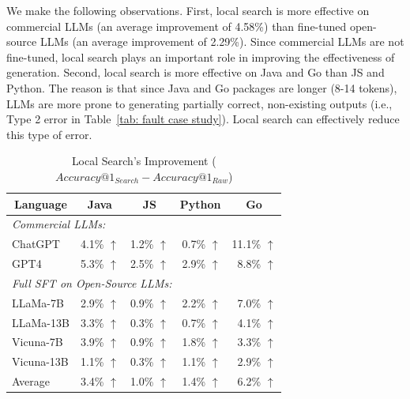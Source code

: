 We make the following observations. First, local search is more effective on commercial LLMs (an average improvement of 4.58\%) than fine-tuned open-source LLMs (an average improvement of 2.29\%).
Since commercial LLMs are not fine-tuned, local search plays an important role in improving the effectiveness of generation. Second, local search is more effective on Java and Go than JS and Python. The reason is that since Java and Go packages are longer (8-14 tokens), LLMs are more prone to generating partially correct, non-existing outputs (i.e., Type 2 error in Table~\ref{tab: fault case study}).  Local search can effectively reduce this type of error. 

\begin{table}[t]
\centering
\small
\caption{Local Search's Improvement ($Accuracy@1_{Search} - Accuracy@1_{Raw}$)}
\label{tab: post processing}
\begin{tabular}{lrrrr}
\toprule
\multicolumn{1}{c}{\multirow{1}{*}{Language}} & \multicolumn{1}{c}{Java}                        &        \multicolumn{1}{c}{JS}                 &          \multicolumn{1}{c}{Python}               &     \multicolumn{1}{c}{Go}                    \\
\midrule
\multicolumn{3}{l}{\textit{Commercial LLMs:}}                          &                         &                         \\
ChatGPT                                       & 4.1\% $\uparrow$       & 1.2\% $\uparrow$       & 0.7\% $\uparrow$       & 11.1\% $\uparrow$                \\
GPT4                                          & 5.3\% $\uparrow$       &    2.5\% $\uparrow$                     &      2.9\% $\uparrow$                   &        8.8\% $\uparrow$                 \\ 
\midrule
\multicolumn{5}{l}{\textit{Full SFT on Open-Source LLMs:}}                                           \\
LLaMa-7B                                      & 2.9\% $\uparrow$       & 0.9\% $\uparrow$       & 2.2\% $\uparrow$       & 7.0\% $\uparrow$     \\
LLaMa-13B                                     & 3.3\% $\uparrow$       & 0.3\% $\uparrow$       & 0.7\% $\uparrow$       & 4.1\% $\uparrow$       \\
Vicuna-7B                                     & 3.9\% $\uparrow$      & 0.9\% $\uparrow$       & 1.8\% $\uparrow$       & 3.3\% $\uparrow$       \\
Vicuna-13B                                    & 1.1\% $\uparrow$      & 0.3\% $\uparrow$       & 1.1\% $\uparrow$       & 2.9\% $\uparrow$       \\
\midrule
Average                                      & 3.4\% $\uparrow$      & 1.0\% $\uparrow$       & 1.4\% $\uparrow$       & 6.2\% $\uparrow$         \\
\bottomrule
\end{tabular}
\end{table}

